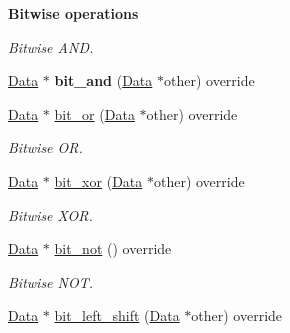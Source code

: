 \begin{Indent}{\bf Bitwise operations}\par
{\em Bitwise A\+ND. }\begin{DoxyCompactItemize}
\item 
\hyperlink{classcreek_1_1_data}{Data} $\ast$ {\bfseries bit\+\_\+and} (\hyperlink{classcreek_1_1_data}{Data} $\ast$other) override\hypertarget{classcreek_1_1_object_a073c68d7506f402f8673e28479b21f3c}{}\label{classcreek_1_1_object_a073c68d7506f402f8673e28479b21f3c}

\item 
\hyperlink{classcreek_1_1_data}{Data} $\ast$ \hyperlink{classcreek_1_1_object_a9a1b1d3bc5e9c625f5a772676bc75c00}{bit\+\_\+or} (\hyperlink{classcreek_1_1_data}{Data} $\ast$other) override\hypertarget{classcreek_1_1_object_a9a1b1d3bc5e9c625f5a772676bc75c00}{}\label{classcreek_1_1_object_a9a1b1d3bc5e9c625f5a772676bc75c00}

\begin{DoxyCompactList}\small\item\em Bitwise OR. \end{DoxyCompactList}\item 
\hyperlink{classcreek_1_1_data}{Data} $\ast$ \hyperlink{classcreek_1_1_object_a5eecc754b434e7b479ab89c19e00b298}{bit\+\_\+xor} (\hyperlink{classcreek_1_1_data}{Data} $\ast$other) override\hypertarget{classcreek_1_1_object_a5eecc754b434e7b479ab89c19e00b298}{}\label{classcreek_1_1_object_a5eecc754b434e7b479ab89c19e00b298}

\begin{DoxyCompactList}\small\item\em Bitwise X\+OR. \end{DoxyCompactList}\item 
\hyperlink{classcreek_1_1_data}{Data} $\ast$ \hyperlink{classcreek_1_1_object_a0c7a0d3cd5dbacdfb86518c208e808f5}{bit\+\_\+not} () override\hypertarget{classcreek_1_1_object_a0c7a0d3cd5dbacdfb86518c208e808f5}{}\label{classcreek_1_1_object_a0c7a0d3cd5dbacdfb86518c208e808f5}

\begin{DoxyCompactList}\small\item\em Bitwise N\+OT. \end{DoxyCompactList}\item 
\hyperlink{classcreek_1_1_data}{Data} $\ast$ \hyperlink{classcreek_1_1_object_acb8fdc8bdf1c3632f62ca082677db5e1}{bit\+\_\+left\+\_\+shift} (\hyperlink{classcreek_1_1_data}{Data} $\ast$other) override\hypertarget{classcreek_1_1_object_acb8fdc8bdf1c3632f62ca082677db5e1}{}\label{classcreek_1_1_object_acb8fdc8bdf1c3632f62ca082677db5e1}


\end{DoxyCompactItemize}
\end{Indent}

